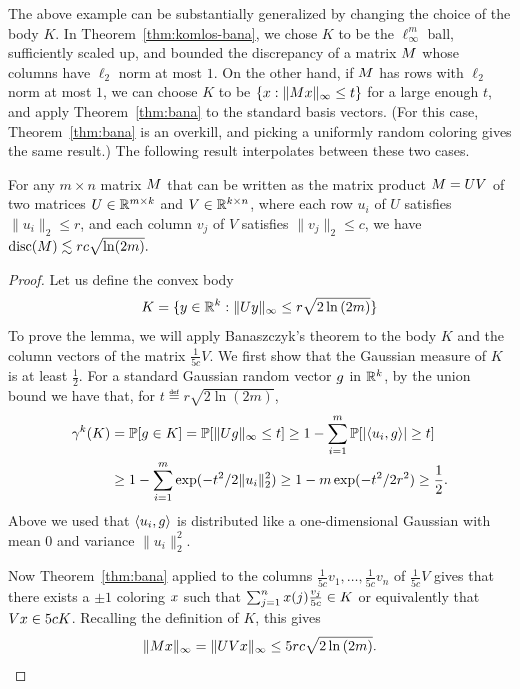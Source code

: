 The above example can be substantially generalized by changing the
choice of the body $K$. In Theorem~\ref{thm:komlos-bana}, we chose $K$
to be the $\ell_\infty^m$ ball, sufficiently scaled up, and bounded
the discrepancy of a matrix $M$ whose columns have $\ell_2$ norm at
most $1$. On the other hand, if $M$ has rows with $\ell_2$ norm at
most $1$, we can choose $K$ to be $\{x: \|M x\|_\infty \le t\}$ for
a large enough $t$, and apply Theorem~\ref{thm:bana} to the standard
basis vectors. (For this case, Theorem~\ref{thm:bana} is an overkill,
and picking a uniformly random coloring gives the same result.) The
following result interpolates between these two cases.


\begin{lemma}\label{lm:fact-ub}
  For any $m\times n$ matrix $M$ that can be written as the matrix
  product $M = UV$ of two matrices $U \in \mathbb{R}^{m\times k}$ and $V\in
  \mathbb{R}^{k\times n}$, where each row
  $u_i$ of $U$ satisfies $\|u_i\|_2 \le r$, and each column $v_j$ of
  $V$ satisfies $\|v_j\|_2 \le c$, 
  we have
  \(
  \operatorname{disc}(M) \lesssim rc \sqrt{\ln(2m)}.
  \)
\end{lemma}
\begin{proof}
  Let us define the convex body
  \[
    K = \{ y \in \mathbb{R}^k: \|Uy \|_{\infty} \leq r\sqrt{2\ln{(2m)}}  \}
  \]
  To prove the lemma, we will apply Banaszczyk's theorem to the body
  $K$ and the column vectors of the matrix
  $\frac{1}{5c} V$. We first show that
  the Gaussian measure of $K$ is at least $\frac12$. For a standard
  Gaussian random vector $g$ in $\mathbb{R}^k$, by the union bound we have
  that, for $t \eqdef r\sqrt{2\ln(2m)}$,
  \begin{align*}
    \gamma^k(K) & = \mathbb{P}[g \in K]
    = \mathbb{P}[\|Ug\|_\infty \le t]
    \ge 1 - \sum_{i = 1}^m \mathbb{P}[|\langle u_i,g\rangle| \ge t]\\
    &\ge 1 - \sum_{i = 1}^m \exp(-t^2/2\|u_i\|_2^2)
      \ge 1 - m \exp(-t^2/2r^2) \ge \frac12.
  \end{align*}
  Above we used that $\langle u_i,g\rangle$ is distributed like a
  one-dimensional Gaussian with mean $0$ and variance
  $\|u_i\|_2^2$.
  
  Now Theorem~\ref{thm:bana} applied to the columns $\frac{1}{5c}v_1,
  \ldots, \frac{1}{5c}v_n$ of $\frac{1}{5c}V$ gives that there exists a $\pm 1$ coloring $x$ such that
    $\sum_{j=1}^n x(j) \frac{v_j}{5c}\in K$ or equivalently that $Vx \in 5c K$.
  Recalling the definition of $K$, this gives
  \[
    \|Mx\|_\infty = \|UVx\|_\infty \le 5rc\sqrt{2\ln{(2m)}}. \qedhere
  \]
\end{proof}

